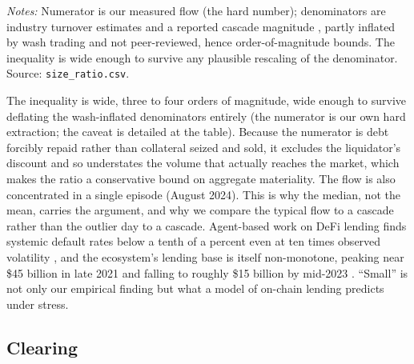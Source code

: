 \begin{table}[t]
\centering
\caption{Size of the DeFi liquidation flow relative to ETH turnover and to
centralized-exchange cascades.}
\label{tab:sizeratio}

\begin{minipage}{0.92\textwidth}
\vspace{2pt}
{\scriptsize \emph{Notes:} Numerator is our measured flow (the hard
number); denominators are industry turnover estimates
\citep{coingecko2024annual,coingecko2024perps} and a reported cascade
magnitude \citep{coinglass2025}, partly inflated by wash trading
\citep{gan2022} and not peer-reviewed, hence order-of-magnitude bounds. The inequality is wide enough to survive any
plausible rescaling of the denominator. Source: \texttt{size\_ratio.csv}.}
\end{minipage}
\end{table}

The inequality is wide, three to four orders of magnitude, wide enough to
survive deflating the wash-inflated denominators entirely (the numerator
is our own hard extraction; the caveat is detailed at the table). Because the
numerator is debt forcibly repaid rather than collateral seized and sold, it
excludes the liquidator's discount and so understates the volume that
actually reaches the market, which makes the ratio a conservative bound on
aggregate materiality. The flow
is also concentrated in a single episode (August 2024). This is why the
median, not the mean, carries the argument, and why we compare the
typical flow to a cascade rather than the outlier day to a cascade.
Agent-based work on DeFi lending finds systemic default rates below a
tenth of a percent even at ten times observed
volatility \citep{chaudhary2022},
and the ecosystem's lending base is itself non-monotone, peaking near
\$45 billion in late 2021 and falling to roughly \$15 billion by mid-2023
\citep{bertomeu2024}. ``Small'' is
not only our empirical finding but what a model of on-chain lending
predicts under stress.

\subsection{Clearing}
\label{sec:clearing}


